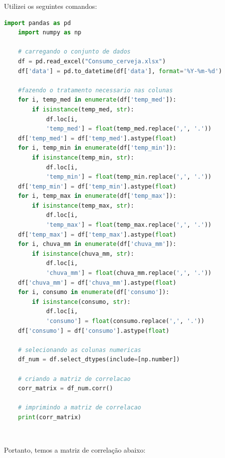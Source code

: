 \documentclass[a4paper, 12pt]{article}
\begin{document}
Utilizei os seguintes comandos:\\


\begin{tcolorbox}[colback=white,boxrule=1pt,arc=5pt,auto outer arc]
  \begin{lstlisting}[language=Python]
    import pandas as pd
    import numpy as np
    
    # carregando o conjunto de dados
    df = pd.read_excel("Consumo_cerveja.xlsx")
    df['data'] = pd.to_datetime(df['data'], format='%Y-%m-%d')
    
    #fazendo o tratamento necessario nas colunas
    for i, temp_med in enumerate(df['temp_med']):
        if isinstance(temp_med, str):
            df.loc[i, 
            'temp_med'] = float(temp_med.replace(',', '.'))
    df['temp_med'] = df['temp_med'].astype(float)
    for i, temp_min in enumerate(df['temp_min']):
        if isinstance(temp_min, str):
            df.loc[i, 
            'temp_min'] = float(temp_min.replace(',', '.'))
    df['temp_min'] = df['temp_min'].astype(float)
    for i, temp_max in enumerate(df['temp_max']):
        if isinstance(temp_max, str):
            df.loc[i, 
            'temp_max'] = float(temp_max.replace(',', '.'))
    df['temp_max'] = df['temp_max'].astype(float)
    for i, chuva_mm in enumerate(df['chuva_mm']):
        if isinstance(chuva_mm, str):
            df.loc[i, 
            'chuva_mm'] = float(chuva_mm.replace(',', '.'))
    df['chuva_mm'] = df['chuva_mm'].astype(float)
    for i, consumo in enumerate(df['consumo']):
        if isinstance(consumo, str):
            df.loc[i, 
            'consumo'] = float(consumo.replace(',', '.'))
    df['consumo'] = df['consumo'].astype(float)
    
    # selecionando as colunas numericas
    df_num = df.select_dtypes(include=[np.number])
    
    # criando a matriz de correlacao
    corr_matrix = df_num.corr()
    
    # imprimindo a matriz de correlacao
    print(corr_matrix)
    \end{lstlisting} \\
\end{tcolorbox}

Portanto, temos a matriz de correlação abaixo: \\
\end{document}
